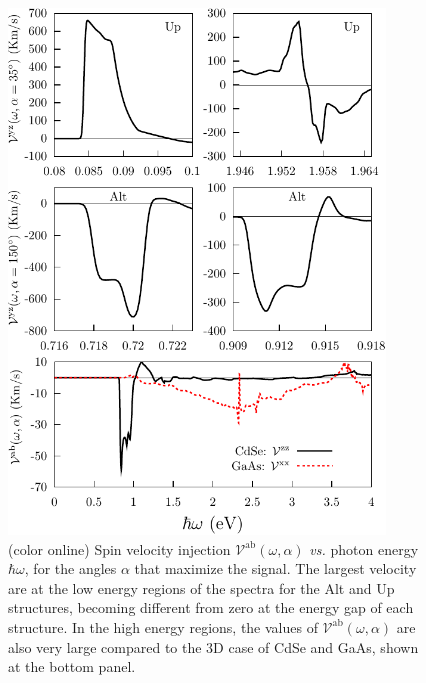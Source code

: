 \documentclass[floatfix,prb,aps,superscriptaddress,showpacs,11pt,preprint,letterpaper]{revtex4}
\def\tama{10cm}
\begin{document}
\begin{figure}[t]
\centering
\includegraphics[width=\tama]{fig3}
\caption{(color online)  Spin velocity injection
  $\mathcal{V}^{\mathrm{ab}}(\omega,\alpha)$ {\it vs.} photon energy
  $\hbar\omega$, for the angles $\alpha$ that maximize the signal. The largest
  velocity are at the low energy regions of the spectra for the Alt and Up
  structures, becoming different from zero at the energy gap of each structure.
  In the high energy regions, the values of
  $\mathcal{V}^{\mathrm{ab}}(\omega,\alpha)$ are also very large compared to
  the 3D case of CdSe and GaAs, shown at the bottom panel.}
\label{fig:vab-str-comp}
\end{figure}
\end{document}

